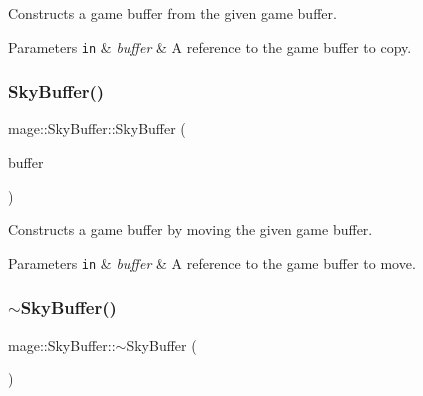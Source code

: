 Constructs a game buffer from the given game buffer.


\begin{DoxyParams}[1]{Parameters}
\mbox{\tt in}  & {\em buffer} & A reference to the game buffer to copy. \\
\hline
\end{DoxyParams}
\hypertarget{structmage_1_1_sky_buffer_afe4eacb2f2a838d5a2deb274d27a8d91}{}\label{structmage_1_1_sky_buffer_afe4eacb2f2a838d5a2deb274d27a8d91} 
\subsubsection{\texorpdfstring{Sky\+Buffer()}{SkyBuffer()}\hspace{0.1cm}{\footnotesize\ttfamily [3/3]}}
{\footnotesize\ttfamily mage\+::\+Sky\+Buffer\+::\+Sky\+Buffer (\begin{DoxyParamCaption}\item[{\hyperlink{structmage_1_1_sky_buffer}{Sky\+Buffer} \&\&}]{buffer }\end{DoxyParamCaption})\hspace{0.3cm}{\ttfamily [default]}}

Constructs a game buffer by moving the given game buffer.


\begin{DoxyParams}[1]{Parameters}
\mbox{\tt in}  & {\em buffer} & A reference to the game buffer to move. \\
\hline
\end{DoxyParams}
\hypertarget{structmage_1_1_sky_buffer_a3e18894ef312290047215f276a2cb0bd}{}\label{structmage_1_1_sky_buffer_a3e18894ef312290047215f276a2cb0bd} 
\subsubsection{\texorpdfstring{$\sim$\+Sky\+Buffer()}{~SkyBuffer()}}
{\footnotesize\ttfamily mage\+::\+Sky\+Buffer\+::$\sim$\+Sky\+Buffer (\begin{DoxyParamCaption}{ }\end{DoxyParamCaption})\hspace{0.3cm}{\ttfamily [default]}}

